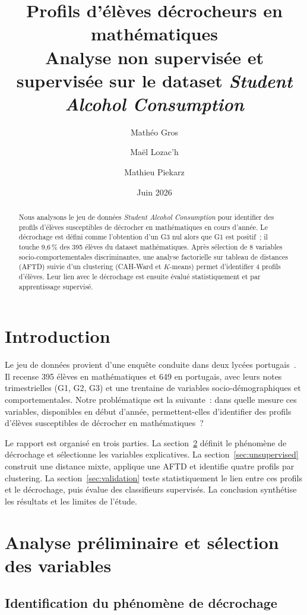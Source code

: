 \documentclass[twocolumn]{article}
\title{\textbf{Profils d'élèves décrocheurs en mathématiques}\\
\large Analyse non supervisée et supervisée sur le dataset \textit{Student Alcohol Consumption}}
\author{Mathéo Gros \and Maël Lozac'h \and Mathieu Piekarz}
\date{Juin 2026}
\begin{document}
\maketitle

\begin{abstract}
Nous analysons le jeu de données \textit{Student Alcohol Consumption} pour identifier des profils d'élèves susceptibles de décrocher en mathématiques en cours d'année. Le décrochage est défini comme l'obtention d'un G3 nul alors que G1 est positif~; il touche 9,6\,\% des 395 élèves du dataset mathématiques. Après sélection de 8 variables socio-comportementales discriminantes, une analyse factorielle sur tableau de distances (AFTD) suivie d'un clustering (CAH-Ward et $K$-means) permet d'identifier 4 profils d'élèves. Leur lien avec le décrochage est ensuite évalué statistiquement et par apprentissage supervisé.
\end{abstract}

\section{Introduction}

Le jeu de données provient d'une enquête conduite dans deux lycées portugais~\cite{cortez2008}. Il recense 395 élèves en mathématiques et 649 en portugais, avec leurs notes trimestrielles (G1, G2, G3) et une trentaine de variables socio-démographiques et comportementales. Notre problématique est la suivante~: dans quelle mesure ces variables, disponibles en début d'année, permettent-elles d'identifier des profils d'élèves susceptibles de décrocher en mathématiques~?

Le rapport est organisé en trois parties. La section~\ref{sec:prelim} définit le phénomène de décrochage et sélectionne les variables explicatives. La section~\ref{sec:unsupervised} construit une distance mixte, applique une AFTD et identifie quatre profils par clustering. La section~\ref{sec:validation} teste statistiquement le lien entre ces profils et le décrochage, puis évalue des classifieurs supervisés. La conclusion synthétise les résultats et les limites de l'étude.

\section{Analyse préliminaire et sélection des variables}
\label{sec:prelim}

\subsection{Identification du phénomène de décrochage}
\end{document}
